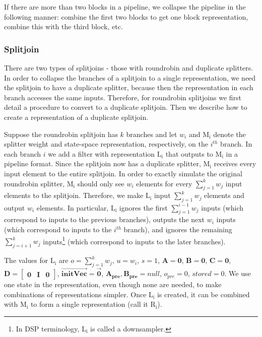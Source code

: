     If there are more than two blocks in a pipeline, we collapse
the pipeline in the following manner: combine the first two blocks
to get one block representation, combine this with the third
block, etc.

\subsubsection{Splitjoin}

    There are two types of splitjoins - those with roundrobin and
duplicate splitters. In order to collapse the branches of a
splitjoin to a single representation, we need the splitjoin to
have a duplicate splitter, because then the representation in each
branch accesses the same inputs. Therefore, for roundrobin
splitjoins we first detail a procedure to convert to a duplicate
splitjoin. Then we describe how to create a representation of a
duplicate splitjoin.


    Suppose the roundrobin splitjoin has $k$ branches and let $w_i$ and
$\mathrm{M_i}$ denote the splitter weight and state-space
representation, respectively, on the $i^{th}$ branch. In each
branch $i$ we add a filter with representation $\mathrm{L_i}$ that
outputs to $\mathrm{M_i}$ in a pipeline format. Since the
splitjoin now has a duplicate splitter, $\mathrm{M_i}$ receives
every input element to the entire splitjoin. In order to exactly
simulate the original roundrobin splitter, $\mathrm{M_i}$ should
only see $w_i$ elements for every $\sum_{j=1}^{k} w_j$ input
elements to the splitjoin. Therefore, we make $\mathrm{L_i}$ input
$\sum_{j=1}^{k} w_j$ elements and output $w_i$ elements. In
particular, $\mathrm{L_i}$ ignores the first $\sum_{j=1}^{i-1}
w_j$ inputs (which correspond to inputs to the previous branches),
outputs the next $w_i$ inputs (which correspond to inputs to the
$i^{th}$ branch), and ignores the remaining $\sum_{j=i+1}^{k} w_j$
inputs\footnote{In DSP terminology, $\mathrm{L_i}$ is called a
downsampler.} (which correspond to inputs to the later branches).

    The values for $\mathrm{L_i}$ are $o = \sum_{j=1}^{k} w_j$, $u = w_i$,
$s = 1$, $\mathbf{A} = \mathbf{0}$, $\mathbf{B} = \mathbf{0}$,
$\mathbf{C} = \mathbf{0}$, $\mathbf{D} = \left [ \begin{array}
{ccc} \mathbf{0} & \mathbf{I} & \mathbf{0} \end{array} \right ]$,
$\overrightarrow{\mathbf{initVec}} = \vec{\mathbf{0}}$,
$\mathbf{A_{pre}}, \mathbf{B_{pre}} = null$, $o_{pre} = 0$,
$stored = 0$. We use one state in the representation, even though
none are needed, to make combinations of representations simpler.
Once $\mathrm{L_i}$ is created, it can be combined with
$\mathrm{M_i}$ to form a single representation (call it
$\mathrm{R_i}$).

